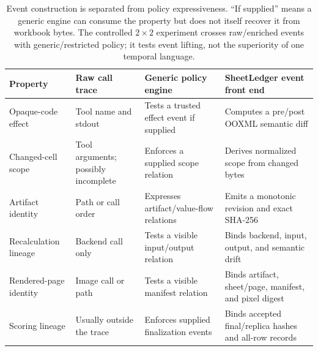 \begin{table}[t]
\caption{Event construction is separated from policy expressiveness. ``If
supplied'' means a generic engine can consume the property but does not itself
recover it from workbook bytes. The controlled $2\times2$ experiment crosses
raw/enriched events with generic/restricted policy; it tests event lifting, not
the superiority of one temporal language.}
\label{tab:event-policy}
\centering
\footnotesize
\setlength{\tabcolsep}{3pt}
\renewcommand{\arraystretch}{1.08}
\begin{tabular}{@{}
  >{\raggedright\arraybackslash}p{2.45cm}
  >{\raggedright\arraybackslash}p{2.65cm}
  >{\raggedright\arraybackslash}p{3.25cm}
  >{\raggedright\arraybackslash}p{4.35cm}@{}}
\toprule
\textbf{Property} & \textbf{Raw call trace} & \textbf{Generic policy engine} &
\textbf{SheetLedger event front end} \\
\midrule
Opaque-code effect & Tool name and stdout & Tests a trusted effect event if supplied &
Computes a pre/post OOXML semantic diff \\
Changed-cell scope & Tool arguments; possibly incomplete & Enforces a supplied scope relation &
Derives normalized scope from changed bytes \\
Artifact identity & Path or call order & Expresses artifact/value-flow relations &
Emits a monotonic revision and exact SHA-256 \\
Recalculation lineage & Backend call only & Tests a visible input/output relation &
Binds backend, input, output, and semantic drift \\
Rendered-page identity & Image call or path & Tests a visible manifest relation &
Binds artifact, sheet/page, manifest, and pixel digest \\
Scoring lineage & Usually outside the trace & Enforces supplied finalization events &
Binds accepted final/replica hashes and all-row records \\
\bottomrule
\end{tabular}
\end{table}
